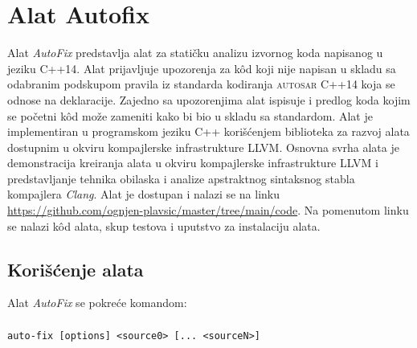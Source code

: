\documentclass[12pt,oneside]{memoir}
\begin{document}
\chapter{Alat Autofix}
\label{chp:autofix}

Alat \textit{AutoFix} predstavlja alat za stati\v{c}ku analizu izvornog koda napisanog u jeziku C++14. Alat prijavljuje upozorenja
za k\^{o}d koji nije napisan u skladu sa odabranim podskupom pravila iz standarda kodiranja \textsc{autosar} C++14 koja se odnose na deklaracije. Zajedno sa upozorenjima alat 
ispisuje i predlog koda kojim se po\v{c}etni k\^{o}d mo\v{z}e zameniti kako bi bio u skladu sa standardom.
Alat je implementiran u programskom jeziku C++ kori\v{s}\'{c}enjem biblioteka za razvoj alata dostupnim u okviru kompajlerske infrastrukture LLVM.
Osnovna svrha alata je demonstracija kreiranja alata u okviru kompajlerske infrastrukture LLVM i predstavljanje tehnika obilaska i analize apstraktnog sintaksnog stabla kompajlera \textit{Clang}. 
Alat je dostupan i nalazi se na linku \url{https://github.com/ognjen-plavsic/master/tree/main/code}. Na pomenutom linku se nalazi k\^{o}d alata, skup testova i uputstvo za instalaciju alata.

\section{Kori\v{s}\'{c}enje alata}

Alat \textit{AutoFix} se pokre\'{c}e komandom:
\\ \\
 \indent \indent \texttt{auto-fix [options] <source0> [... <sourceN>]}
\\ 
\end{document}
